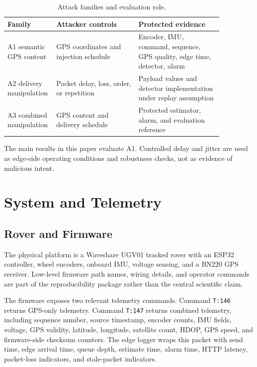 \documentclass[conference]{IEEEtran}
\begin{document}
\begin{table}[t]
\centering
\caption{Attack families and evaluation role.}
\label{tab:attack_families}
\scriptsize
\begin{tabular}{L{0.13\linewidth} L{0.36\linewidth} L{0.37\linewidth}}
\toprule
\textbf{Family} & \textbf{Attacker controls} & \textbf{Protected evidence} \\
\midrule
A1 semantic GPS content & GPS coordinates and injection schedule &
Encoder, IMU, command, sequence, GPS quality, edge time, detector, alarm \\
A2 delivery manipulation & Packet delay, loss, order, or repetition &
Payload values and detector implementation under replay assumption \\
A3 combined manipulation & GPS content and delivery schedule &
Protected estimator, alarm, and evaluation reference \\
\bottomrule
\end{tabular}
\end{table}

The main results in this paper evaluate A1. Controlled delay and jitter are
used as edge-side operating conditions and robustness checks, not as evidence
of malicious intent.

\section{System and Telemetry}
\label{sec:system}

\subsection{Rover and Firmware}

The physical platform is a Waveshare UGV01 tracked rover with an ESP32
controller, wheel encoders, onboard IMU, voltage sensing, and a BN220 GPS
receiver. Low-level firmware path names, wiring details, and operator commands
are part of the reproducibility package rather than the central scientific
claim.

The firmware exposes two relevant telemetry commands. Command \texttt{T:146}
returns GPS-only telemetry. Command \texttt{T:147} returns combined telemetry,
including sequence number, source timestamp, encoder counts, IMU fields,
voltage, GPS validity, latitude, longitude, satellite count, HDOP, GPS speed,
and firmware-side checksum counters. The edge logger wraps this packet with
send time, edge arrival time, queue depth, estimate time, alarm time, HTTP
latency, packet-loss indicators, and stale-packet indicators.
\end{document}
